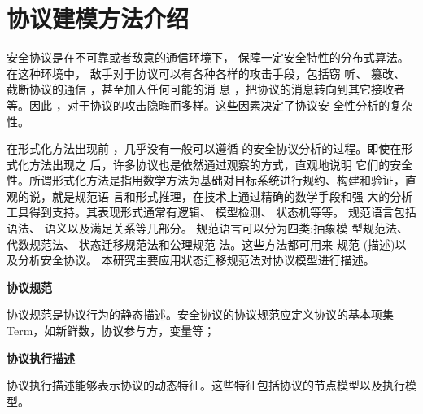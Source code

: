 



\section{协议建模方法介绍}

安全协议是在不可靠或者敌意的通信环境下，
保障一定安全特性的分布式算法。在这种环境中，
敌手对于协议可以有各种各样的攻击手段，包括窃
听、 篡改、 截断协议的通信 ，甚至加入任何可能的消
息 ，把协议的消息转向到其它接收者等。因此 ，对于协议的攻击隐晦而多样。这些因素决定了协议安
全性分析的复杂性。

在形式化方法出现前 ，几乎没有一般可以遵循
的安全协议分析的过程。即使在形式化方法出现之
后，许多协议也是依然通过观察的方式，直观地说明
它们的安全性。所谓形式化方法是指用数学方法为基础对目标系统进行规约、构建和验证，直观的说，就是规范语
言和形式推理，在技术上通过精确的数学手段和强
大的分析工具得到支持。其表现形式通常有逻辑、 模型检测、 状态机等等。
规范语言包括语法、 语义以及满足关系等几部分。
规范语言可以分为四类:抽象模
型规范法、 代数规范法、 状态迁移规范法和公理规范
法。这些方法都可用来
规范 (描述)以及分析安全协议。
本研究主要应用状态迁移规范法对协议模型进行描述。

\textbf{协议规范}

协议规范是协议行为的静态描述。安全协议的协议规范应定义协议的基本项集Term，如新鲜数，协议参与方，变量等；

\textbf{协议执行描述}

协议执行描述能够表示协议的动态特征。这些特征包括协议的节点模型以及执行模型。

